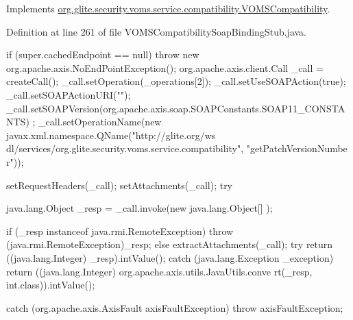 Implements \hyperlink{interfaceorg_1_1glite_1_1security_1_1voms_1_1service_1_1compatibility_1_1VOMSCompatibility_ae44bf014fa2a1f2a6b1aabb29e393a04}{org.glite.security.voms.service.compatibility.VOMSCompatibility}.



Definition at line 261 of file VOMSCompatibilitySoapBindingStub.java.


\begin{DoxyCode}
                                                                       {
        if (super.cachedEndpoint == null) {
            throw new org.apache.axis.NoEndPointException();
        }
        org.apache.axis.client.Call _call = createCall();
        _call.setOperation(_operations[2]);
        _call.setUseSOAPAction(true);
        _call.setSOAPActionURI("");
        _call.setSOAPVersion(org.apache.axis.soap.SOAPConstants.SOAP11_CONSTANTS)
      ;
        _call.setOperationName(new javax.xml.namespace.QName("http://glite.org/ws
      dl/services/org.glite.security.voms.service.compatibility", "getPatchVersionNumbe
      r"));

        setRequestHeaders(_call);
        setAttachments(_call);
 try {        java.lang.Object _resp = _call.invoke(new java.lang.Object[] {});

        if (_resp instanceof java.rmi.RemoteException) {
            throw (java.rmi.RemoteException)_resp;
        }
        else {
            extractAttachments(_call);
            try {
                return ((java.lang.Integer) _resp).intValue();
            } catch (java.lang.Exception _exception) {
                return ((java.lang.Integer) org.apache.axis.utils.JavaUtils.conve
      rt(_resp, int.class)).intValue();
            }
        }
  } catch (org.apache.axis.AxisFault axisFaultException) {
  throw axisFaultException;
}
    }
\end{DoxyCode}


